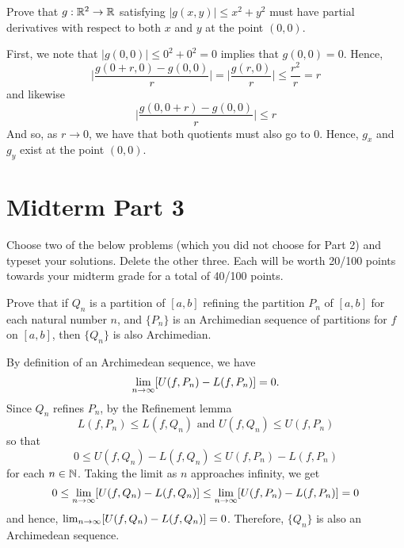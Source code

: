\documentclass[letterpaper, twoside, 12pt]{book}
\begin{document}
\begin{exercise}[4]
  Prove that \(g:\mathbb R^2\to\mathbb R\) satisfying \(|g(x,y)|\leq x^2+y^2\)
  must have partial derivatives with respect to both \(x\) and \(y\)
  at the point \((0,0)\).
\end{exercise}

\begin{solution}
    First, we note that \( |g(0,0)| \leq 0^2 + 0^2 = 0\) implies that
    \(g(0,0) = 0\). Hence,
    \[ \bigg| \frac{g(0 + r, 0) - g(0,0)}{r} \bigg| 
    = \bigg| \frac{g(r,0)}{r} \bigg| \leq \frac{r^2}{r} = r \]
    and likewise
    \[ \bigg| \frac{g(0, 0 + r) - g(0,0)}{r} \bigg| \leq r \]
    And so, as \(r \to 0\), we have that both quotients must
    also go to \(0\). Hence, \(g_x\) and \(g_y\) exist at the
    point \((0,0)\).
\end{solution}







\chapter*{Midterm Part 3}

Choose two of the below problems (which you did not choose for
Part 2) and typeset your solutions. Delete the other three.
Each will be worth 20/100 points towards your midterm grade
for a total of 40/100 points.


\begin{exercise}[1]
Prove that if \(Q_n\) is a partition of \([a,b]\) refining
the partition \(P_n\) of \([a,b]\) for each
natural number \(n\), and \(\{P_n\}\) is an Archimedian sequence of
partitions for \(f\) on \([a,b]\), then \(\{Q_n\}\) is also Archimedian.
\end{exercise}

\begin{solution}
    By definition of an Archimedean sequence, we have 
    \[\lim_{n \to \infty} [U(f, P_n) - L(f, P_n) ] = 0 . \]
    Since \(Q_n\) refines \(P_n\), by the Refinement lemma
    \[ L(f, P_n) \leq L(f, Q_n) \text{~and~} U(f, Q_n) \leq U(f, P_n) \]
    so that 
    \[ 0 \leq U(f, Q_n) - L(f, Q_n) \leq U(f, P_n) - L(f, P_n) \]
    for each \(n \in \mathbb N\). Taking the limit as \(n\) approaches
    infinity, we get
    \[ 0 \leq \lim_{n \to \infty} [U(f, Q_n) - L(f, Q_n)] \leq \lim_{n \to \infty} [U(f, P_n) - L(f, P_n)] = 0 \]
    and hence, \(\lim_{n \to \infty} [U(f, Q_n) - L(f, Q_n)] = 0\). Therefore,
    \(\{Q_n\}\) is also an Archimedean sequence.   
\end{solution}
\end{document}
